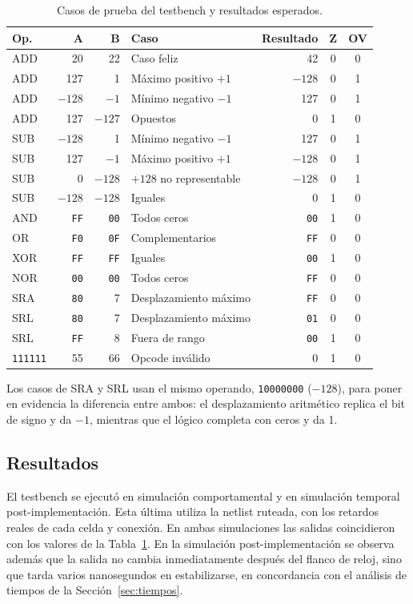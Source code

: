 \begin{table}[H]
	\centering
	\caption{Casos de prueba del testbench y resultados esperados.}
	\label{tab:casos}
	\begin{tabular}{lrrlrcc}
		\toprule
		\textbf{Op.} & \textbf{A} & \textbf{B} & \textbf{Caso} & \textbf{Resultado} & \textbf{Z} & \textbf{OV} \\
		\midrule
		ADD & 20 & 22 & Caso feliz & 42 & 0 & 0 \\
		ADD & 127 & 1 & Máximo positivo $+1$ & $-128$ & 0 & 1 \\
		ADD & $-128$ & $-1$ & Mínimo negativo $-1$ & 127 & 0 & 1 \\
		ADD & 127 & $-127$ & Opuestos & 0 & 1 & 0 \\
		SUB & $-128$ & 1 & Mínimo negativo $-1$ & 127 & 0 & 1 \\
		SUB & 127 & $-1$ & Máximo positivo $+1$ & $-128$ & 0 & 1 \\
		SUB & 0 & $-128$ & $+128$ no representable & $-128$ & 0 & 1 \\
		SUB & $-128$ & $-128$ & Iguales & 0 & 1 & 0 \\
		AND & \texttt{FF} & \texttt{00} & Todos ceros & \texttt{00} & 1 & 0 \\
		OR  & \texttt{F0} & \texttt{0F} & Complementarios & \texttt{FF} & 0 & 0 \\
		XOR & \texttt{FF} & \texttt{FF} & Iguales & \texttt{00} & 1 & 0 \\
		NOR & \texttt{00} & \texttt{00} & Todos ceros & \texttt{FF} & 0 & 0 \\
		SRA & \texttt{80} & 7 & Desplazamiento máximo & \texttt{FF} & 0 & 0 \\
		SRL & \texttt{80} & 7 & Desplazamiento máximo & \texttt{01} & 0 & 0 \\
		SRL & \texttt{FF} & 8 & Fuera de rango & \texttt{00} & 1 & 0 \\
		\texttt{111111} & 55 & 66 & Opcode inválido & 0 & 1 & 0 \\
		\bottomrule
	\end{tabular}
\end{table}

Los casos de SRA y SRL usan el mismo operando, \texttt{10000000} ($-128$), para poner en evidencia la diferencia entre ambos: el desplazamiento aritmético replica el bit de signo y da $-1$, mientras que el lógico completa con ceros y da 1.

\subsection{Resultados}
El testbench se ejecutó en simulación comportamental y en simulación temporal post-implementación. Esta última utiliza la netlist ruteada, con los retardos reales de cada celda y conexión. En ambas simulaciones las salidas coincidieron con los valores de la Tabla~\ref{tab:casos}. En la simulación post-implementación se observa además que la salida no cambia inmediatamente después del flanco de reloj, sino que tarda varios nanosegundos en estabilizarse, en concordancia con el análisis de tiempos de la Sección~\ref{sec:tiempos}.

